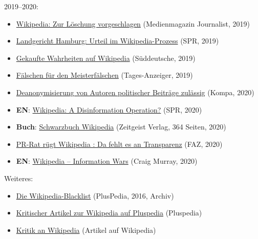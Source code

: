 2019--2020:

\begin{itemize}
\tightlist
\item
  \href{https://web.archive.org/web/20190705140019/https://www.journalist-magazin.de/hintergrund/zur-loeschung-vorgeschlagen}{Wikipedia:
  Zur Löschung vorgeschlagen} (Medienmagazin Journalist, 2019)
\item
  \href{https://swprs.org/der-wikipedia-prozess/}{Landgericht Hamburg:
  Urteil im Wikipedia-Prozess} (SPR, 2019)
\item
  \href{https://www.sueddeutsche.de/digital/wikipedia-werbung-manipulation-schleichwerbung-wissen-1.4496890}{Gekaufte
  Wahrheiten auf Wikipedia} (Süddeutsche, 2019)
\item
  \href{https://www.tagesanzeiger.ch/news/standard/faelschen-fuer-den-meisterfaelscher/story/10949518}{Fälschen
  für den Meisterfälschen} (Tages-Anzeiger, 2019)
\item
  \href{https://kanzleikompa.de/2020/02/18/olg-hamburg-deanonymisierung-von-autoren-politischer-beitraege-zulaessig/}{Deanonymisierung
  von Autoren politischer Beiträge zulässig} (Kompa, 2020)
\item
  \textbf{EN}:
  \href{https://swprs.org/wikipedia-disinformation-operation/}{Wikipedia:
  A Disinformation Operation?} (SPR, 2020)
\item
  \textbf{Buch}:
  \href{https://www.amazon.de/Schwarzbuch-Wikipedia-Diffamierung-Falschinformationen-Online-Enzyklop\%C3\%A4die/dp/3943007278}{Schwarzbuch
  Wikipedia} (Zeitgeist Verlag, 364 Seiten, 2020)
\item
  \href{https://www.faz.net/aktuell/feuilleton/medien/deutscher-rat-fuer-public-relations-ruegt-wikipedia-16733775.html}{PR-Rat
  rügt Wikipedia : Da fehlt es an Transparenz} (FAZ, 2020)
\item
  \textbf{EN}:
  \href{https://www.craigmurray.org.uk/archives/2020/04/information-wars/}{Wikipedia
  -- Information Wars} (Craig Murray, 2020)
\end{itemize}

Weiteres:

\begin{itemize}
\tightlist
\item
  \href{https://web.archive.org/web/20160907093409/http://de.pluspedia.org/wiki/Wikipedia_Blacklist}{Die
  Wikipedia-Blacklist} (PlusPedia, 2016, Archiv)
\item
  \href{http://de.pluspedia.org/wiki/Wikipedia}{Kritischer Artikel zur
  Wikipedia auf Pluspedia} (Pluspedia)
\item
  \href{https://de.wikipedia.org/wiki/Kritik_an_Wikipedia}{Kritik an
  Wikipedia} (Artikel auf Wikipedia)
\end{itemize}

